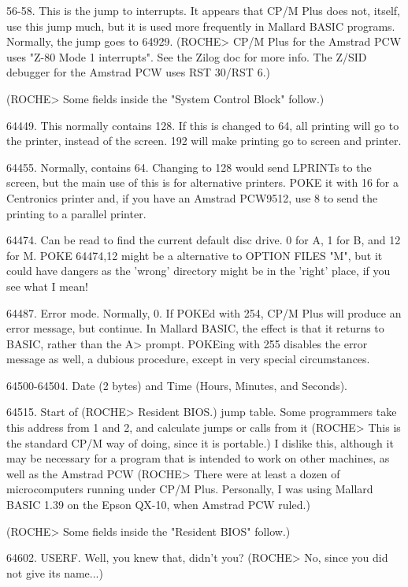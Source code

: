 56-58.  This  is the jump to interrupts. It appears that CP/M Plus  does  not, 
itself,  use this jump much, but it is used more frequently in  Mallard  BASIC 
programs. Normally, the jump goes to 64929. (ROCHE> CP/M Plus for the  Amstrad 
PCW uses "Z-80 Mode 1 interrupts". See the Zilog doc for more info. The  Z/SID 
debugger for the Amstrad PCW uses RST 30/RST 6.)

(ROCHE> Some fields inside the "System Control Block" follow.)

64449. This normally contains 128. If this is changed to 64, all printing will 
go to the printer, instead of the screen. 192 will make printing go to  screen 
and printer.

64455.  Normally,  contains  64. Changing to 128 would  send  LPRINTs  to  the 
screen, but the main use of this is for alternative printers. POKE it with  16 
for  a Centronics printer and, if you have an Amstrad PCW9512, use 8  to  send 
the printing to a parallel printer.

64474.  Can be read to find the current default disc drive. 0 for A, 1 for  B, 
and 12 for M. POKE 64474,12 might be a alternative to OPTION FILES "M", but it 
could have dangers as the 'wrong' directory might be in the 'right' place,  if 
you see what I mean!

64487.  Error mode. Normally, 0. If POKEd with 254, CP/M Plus will produce  an 
error  message, but continue. In Mallard BASIC, the effect is that it  returns 
to  BASIC,  rather  than the A> prompt. POKEing with 255  disables  the  error 
message as well, a dubious procedure, except in very special circumstances.

64500-64504. Date (2 bytes) and Time (Hours, Minutes, and Seconds).

64515. Start of (ROCHE> Resident BIOS.) jump table. Some programmers take this 
address from 1 and 2, and calculate jumps or calls from it (ROCHE> This is the 
standard CP/M way of doing, since it is portable.) I dislike this, although it 
may be necessary for a program that is intended to work on other machines,  as 
well as the Amstrad PCW (ROCHE> There were at least a dozen of  microcomputers 
running  under  CP/M Plus. Personally, I was using Mallard BASIC 1.39  on  the 
Epson QX-10, when Amstrad PCW ruled.)

(ROCHE> Some fields inside the "Resident BIOS" follow.)

64602.  USERF. Well, you knew that, didn't you? (ROCHE> No, since you did  not 
give its name...)

